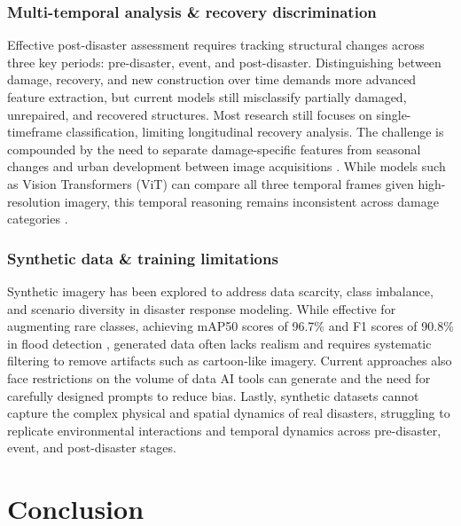 \documentclass[conference,a4paper]{IEEEtran}
\begin{document}
\subsubsection{\textbf{Multi-temporal analysis \& recovery discrimination}}
Effective post-disaster assessment requires tracking structural changes across three key periods: pre-disaster, event, and post-disaster. Distinguishing between damage, recovery, and new construction over time demands more advanced feature extraction, but current models still misclassify partially damaged, unrepaired, and recovered structures. Most research still focuses on single-timeframe classification, limiting longitudinal recovery analysis. The challenge is compounded by the need to separate damage-specific features from seasonal changes and urban development between image acquisitions \cite{kimDisasterAssessmentUsing2022}. While models such as Vision Transformers (ViT) can compare all three temporal frames given high-resolution imagery, this temporal reasoning remains inconsistent across damage categories \cite{lagapEnhancingPostDisasterDamage2025}.

\subsubsection{\textbf{Synthetic data \& training limitations}}
Synthetic imagery has been explored to address data scarcity, class imbalance, and scenario diversity in disaster response modeling. While effective for augmenting rare classes, achieving mAP50 scores of 96.7\% and F1 scores of 90.8\% in flood detection \cite{teohExploringGenerativeAI2024}, generated data often lacks realism and requires systematic filtering to remove artifacts such as cartoon-like imagery. Current approaches also face restrictions on the volume of data AI tools can generate and the need for carefully designed prompts to reduce bias. Lastly, synthetic datasets cannot capture the complex physical and spatial dynamics of real disasters, struggling to replicate environmental interactions and temporal dynamics across pre-disaster, event, and post-disaster stages.


\section{Conclusion}




  
\end{document}
